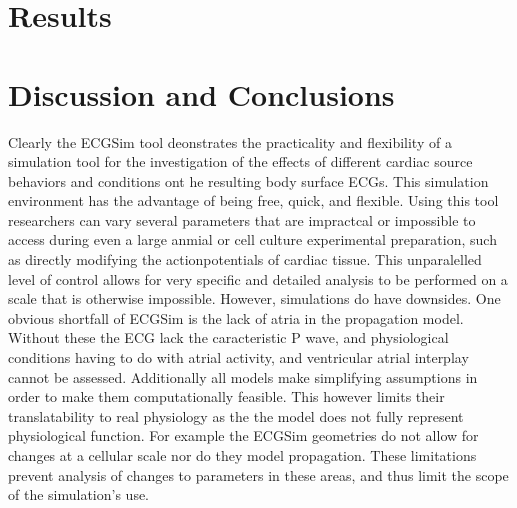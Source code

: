 \documentclass[12pt]{article}
\begin{document}
 
\section{Results}


\section{Discussion and Conclusions}


Clearly the ECGSim tool deonstrates the practicality and flexibility of a simulation tool for the investigation of the effects of different cardiac source behaviors and conditions ont he resulting body surface ECGs. This simulation environment has the advantage of being free, quick, and flexible. Using this tool researchers can vary several parameters that are impractcal or impossible to access during even a large anmial or cell culture experimental preparation, such as directly modifying the actionpotentials of cardiac tissue. This unparalelled level of control allows for very specific and detailed analysis to be performed on a scale that is otherwise impossible. However, simulations do have downsides. One obvious shortfall of ECGSim is the lack of atria in the propagation model. Without these the ECG lack the caracteristic P wave, and physiological conditions having to do with atrial activity, and ventricular atrial interplay cannot be assessed.  Additionally all models make simplifying assumptions in order to make them computationally feasible. This however limits their translatability to real physiology as the the model does not fully represent physiological function. For example the ECGSim geometries do not allow for changes at a cellular scale nor do they model propagation. These limitations prevent analysis of changes to parameters in these areas, and thus limit the scope of the simulation's use. 


%
%
\end{document}
